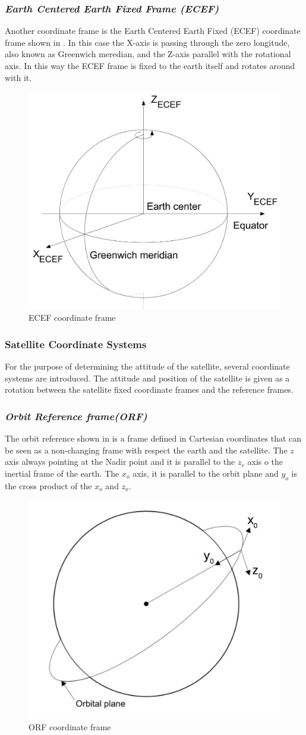 \subsubsection{\textit{Earth Centered Earth Fixed Frame (ECEF)}}
Another coordinate frame is the Earth Centered Earth Fixed (ECEF) coordinate frame shown in . In this case the X-axis is passing through the zero longitude, also known as Greenwich meredian, and the Z-axis parallel with the rotational axis. In this way the ECEF frame is fixed to the earth itself and rotates around with it.
\begin{figure}[H]
	\centering
	\includegraphics[width=0.5\linewidth]{figures/ECEF}
	\caption{ECEF coordinate frame}
	\label{fig:ECEF}
\end{figure}
\subsubsection{Satellite Coordinate Systems}
For the purpose of determining the attitude of the satellite, several coordinate systems are introduced. The attitude and position of the satellite is given as a rotation between the satellite fixed coordinate frames and the reference frames.
\subsubsection{\textit{Orbit Reference frame(ORF)}}
The orbit reference shown in  is a frame defined in Cartesian coordinates that can be seen as a non-changing frame with respect the earth and the satellite. The $z$ axis always pointing at the Nadir point and it is parallel to the $z_{e}$ axis o the inertial frame of the earth. The $x_{o}$ axis, it is parallel to the orbit plane and $y_{o}$ is the cross product of the $x_{o}$ and $z_{o}$. 
\begin{figure}[H]
	\centering
	\includegraphics[width=0.4\linewidth]{figures/OFR}
	\caption{ORF coordinate frame}
	\label{fig:OFR}
\end{figure}
